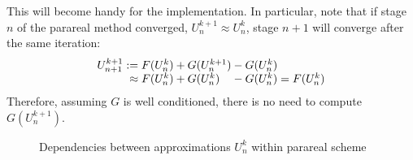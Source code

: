 This will become handy for the implementation.
In particular, note that if stage $n$ of the parareal method converged,
\ie $U^{k+1}_n \approx U^k_n$,
stage $n+1$ will converge after the same iteration:
\begin{equation}
  \begin{array}{r@{}l@{}l@{}l}
    U^{k+1}_{n+1}
    :={}      & F(U^k_n) &{}+ G(U^{k+1}_n) &{}- G(U^k_n) \\
    \approx{} & F(U^k_n) &{}+ G(U^k_n)     &{}- G(U^k_n)
    = F(U^k_n)
  \end{array}
\end{equation}
Therefore,
assuming $G$ is well conditioned,
there is no need to compute $G(U^{k+1}_n)$.

\begin{figure}[htb]
  \caption{Dependencies between approximations $U^k_n$ within parareal scheme}
  \label{fig:pr:DAG}
\end{figure}

